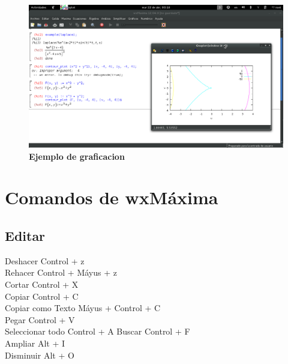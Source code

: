 \documentclass[10pt,a4paper]{book}
\begin{document}
\begin{small}
\begin{figure}[htb]
\begin{center}
\includegraphics[width=13cm]{fotos/cap13}
\caption{\textbf{Ejemplo de graficacion}}
\end{center}
\end{figure}
\end{small}
\chapter{Comandos de wxMáxima}
\section{Editar}
Deshacer Control + z \\
Rehacer Control + Máyus + z \\
Cortar Control + X \\
Copiar Control + C \\
Copiar como Texto Máyus + Control + C \\
Pegar Control + V\\
Seleccionar todo Control + A
Buscar Control + F\\
Ampliar Alt + I\\
Disminuir Alt + O\\
\end{document}

